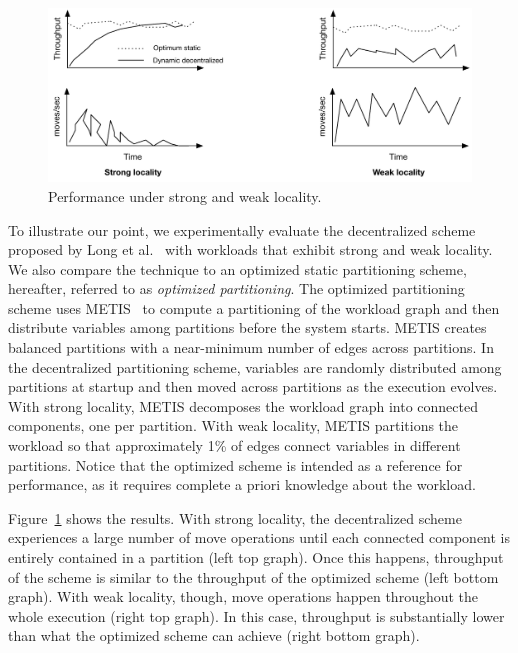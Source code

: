 \begin{figure}[ht]
	\center
	\includegraphics[width=0.6\linewidth]{figures/motivation}
	\caption{Performance under strong and weak locality.}
	\label{fig:motivation}
\end{figure}




To illustrate our point, we experimentally evaluate the decentralized
scheme proposed by Long et al.~\cite{hoang2016} with workloads that
exhibit strong and weak locality.  We also compare the technique to an
optimized static partitioning scheme, hereafter, referred to as
\emph{optimized partitioning}.  The optimized partitioning scheme uses
METIS~\cite{Abou-Rjeili:2006} to compute a partitioning of the
workload graph and then distribute variables among partitions before the
system starts.  METIS creates balanced partitions with a near-minimum
number of edges across partitions.  In the decentralized partitioning
scheme, variables are randomly distributed among partitions at startup
and then moved across partitions as the execution evolves.  With
strong locality, METIS decomposes the workload graph into connected
components, one per partition.  With weak locality, METIS partitions
the workload so that approximately 1\% of edges connect variables in
different partitions.  Notice that the optimized scheme is intended as
a reference for performance, as it requires complete a priori
knowledge about the workload.

Figure~\ref{fig:motivation} shows the results.  With strong locality,
the decentralized scheme experiences a large number of move operations
until each connected component is entirely contained in a partition
(left top graph).  Once this happens, throughput of the scheme is
similar to the throughput of the optimized scheme (left bottom graph).
With weak locality, though, move operations happen throughout the
whole execution (right top graph).  In this case, throughput is
substantially lower than what the optimized scheme can achieve (right
bottom graph).


